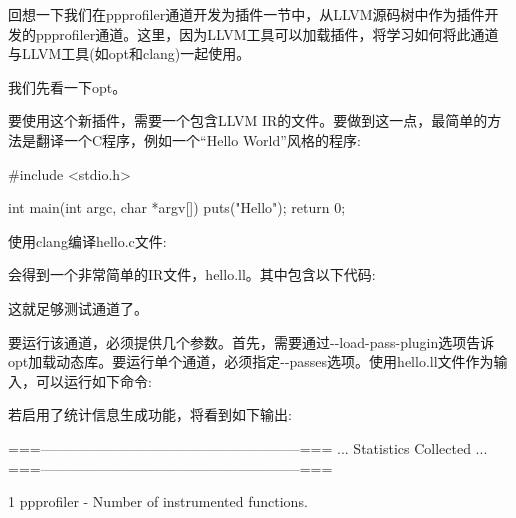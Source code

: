 回想一下我们在ppprofiler通道开发为插件一节中，从LLVM源码树中作为插件开发的ppprofiler通道。这里，因为LLVM工具可以加载插件，将学习如何将此通道与LLVM工具(如opt和clang)一起使用。

我们先看一下opt。


要使用这个新插件，需要一个包含LLVM IR的文件。要做到这一点，最简单的方法是翻译一个C程序，例如一个“Hello World”风格的程序:

\begin{cpp}
#include <stdio.h>

int main(int argc, char *argv[]) {
    puts("Hello");
    return 0;
}
\end{cpp}

使用clang编译hello.c文件:


会得到一个非常简单的IR文件，hello.ll。其中包含以下代码:


这就足够测试通道了。

要运行该通道，必须提供几个参数。首先，需要通过-{}-load-pass-plugin选项告诉opt加载动态库。要运行单个通道，必须指定-{}-passes选项。使用hello.ll文件作为输入，可以运行如下命令:


若启用了统计信息生成功能，将看到如下输出:

\begin{shell}
===--------------------------------------------------------===
... Statistics Collected ...
===--------------------------------------------------------===

1 ppprofiler - Number of instrumented functions.
\end{shell}


